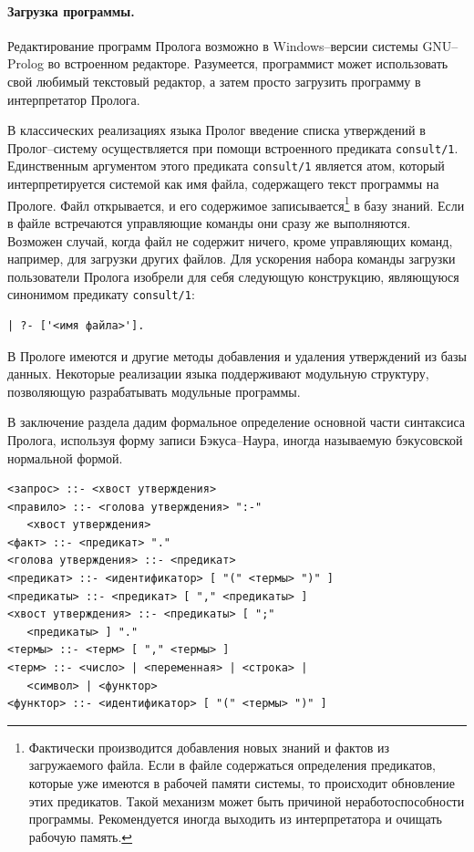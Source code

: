 \documentclass[12pt, openany, twoside]{book} %
\begin{document}
\paragraph{Загрузка программы.} Редактирование программ Пролога возможно в Windows--версии системы GNU--Prolog во встроенном редакторе. Разумеется, программист может использовать свой любимый текстовый редактор, а затем просто загрузить программу в интерпретатор Пролога.

В классических реализациях языка Пролог введение списка утверждений в Пролог--систему осуществляется при помощи встроенного предиката {\tt consult/1}. Единственным аргументом этого предиката {\tt consult/1} является атом, который интерпретируется системой как имя файла, содержащего текст программы на Прологе. Файл открывается, и его содержимое записывается\footnote{Фактически производится добавления новых знаний и фактов из загружаемого файла. Если в файле содержаться определения предикатов, которые уже имеются в рабочей памяти системы, то происходит обновление этих предикатов. Такой механизм может быть причиной неработоспособности программы. Рекомендуется иногда выходить из интерпретатора и очищать рабочую память.} в базу знаний. Если в файле встречаются управляющие команды они сразу же выполняются. Возможен случай, когда файл не содержит ничего, кроме управляющих команд, например, для загрузки других файлов. Для ускорения набора команды загрузки пользователи Пролога изобрели для себя следующую конструкцию, являющуюся синонимом предикату {\tt consult/1}:
{\tt\begin{verbatim}
| ?- ['<имя файла>'].
\end{verbatim}}

В Прологе имеются и другие методы добавления и удаления утверждений из базы данных. Некоторые реализации языка поддерживают модульную структуру, позволяющую разрабатывать модульные программы.

В заключение раздела дадим формальное определение основной части синтаксиса Пролога, используя форму записи Бэкуса--Наура, иногда называемую бэкусовской нормальной формой.

{\tt\begin{verbatim}
<запрос> ::- <хвост утверждения>
<правило> ::- <голова утверждения> ":-"
   <хвост утверждения>
<факт> ::- <предикат> "."
<голова утверждения> ::- <предикат>
<предикат> ::- <идентификатор> [ "(" <термы> ")" ]
<предикаты> ::- <предикат> [ "," <предикаты> ]
<хвост утверждения> ::- <предикаты> [ ";"
   <предикаты> ] "."
<термы> ::- <терм> [ "," <термы> ]
<терм> ::- <число> | <переменная> | <строка> |
   <символ> | <функтор>
<функтор> ::- <идентификатор> [ "(" <термы> ")" ]
\end{verbatim}}
\end{document}
